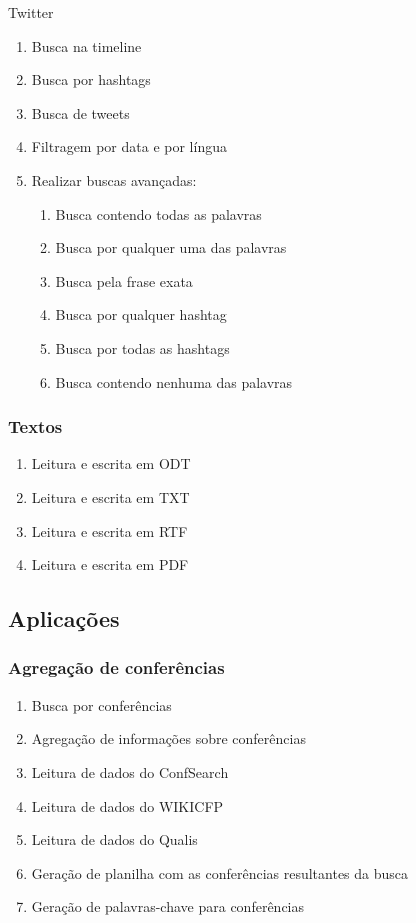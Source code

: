 Twitter
\begin{enumerate}
\item Busca na timeline
\item Busca por hashtags
\item Busca de tweets
\item Filtragem por data e por língua
\item Realizar buscas avançadas:
\begin{enumerate}
\item Busca contendo todas as palavras
\item Busca por qualquer uma das palavras
\item Busca pela frase exata
\item Busca por qualquer hashtag
\item Busca por todas as hashtags
\item Busca contendo nenhuma das palavras
\end{enumerate}
\end{enumerate}

\subsubsection{Textos}
\begin{enumerate}
\item Leitura e escrita em ODT
\item Leitura e escrita em TXT
\item Leitura e escrita em RTF
\item Leitura e escrita em PDF
\end{enumerate}

\subsection{Aplicações}

\subsubsection{Agregação de conferências}
\begin{enumerate}
\item Busca por conferências
\item Agregação de informações sobre conferências
\item Leitura de dados do ConfSearch
\item Leitura de dados do WIKICFP
\item Leitura de dados do Qualis
\item Geração de planilha com as conferências resultantes da busca
\item Geração de palavras-chave para conferências
\end{enumerate}

